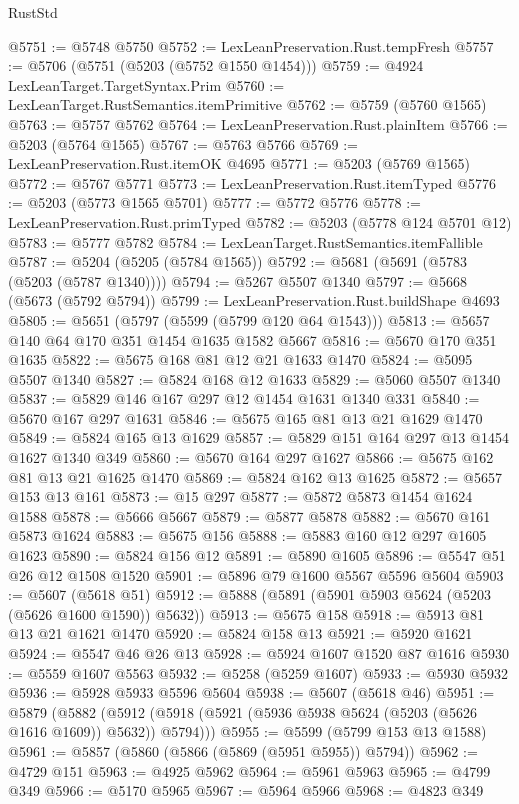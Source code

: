 \begin{lexlean}{RustStd}
\begin{coremodule}
{\begin{coremodule}
{{{{{{{{{{{{{{{{{{{{{{{{{{{{{{@5751 := @5748 @5750
@5752 := LexLeanPreservation.Rust.tempFresh
@5757 := @5706 (@5751 (@5203 (@5752 @1550 @1454)))
@5759 := @4924 LexLeanTarget.TargetSyntax.Prim
@5760 := LexLeanTarget.RustSemantics.itemPrimitive
@5762 := @5759 (@5760 @1565)
@5763 := @5757 @5762
@5764 := LexLeanPreservation.Rust.plainItem
@5766 := @5203 (@5764 @1565)
@5767 := @5763 @5766
@5769 := LexLeanPreservation.Rust.itemOK @4695
@5771 := @5203 (@5769 @1565)
@5772 := @5767 @5771
@5773 := LexLeanPreservation.Rust.itemTyped
@5776 := @5203 (@5773 @1565 @5701)
@5777 := @5772 @5776
@5778 := LexLeanPreservation.Rust.primTyped
@5782 := @5203 (@5778 @124 @5701 @12)
@5783 := @5777 @5782
@5784 := LexLeanTarget.RustSemantics.itemFallible
@5787 := @5204 (@5205 (@5784 @1565))
@5792 := @5681 (@5691 (@5783 (@5203 (@5787 @1340))))
@5794 := @5267 @5507 @1340
@5797 := @5668 (@5673 (@5792 @5794))
@5799 := LexLeanPreservation.Rust.buildShape @4693
@5805 := @5651 (@5797 (@5599 (@5799 @120 @64 @1543)))
@5813 := @5657 @140 @64 @170 @351 @1454 @1635 @1582 @5667
@5816 := @5670 @170 @351 @1635
@5822 := @5675 @168 @81 @12 @21 @1633 @1470
@5824 := @5095 @5507 @1340
@5827 := @5824 @168 @12 @1633
@5829 := @5060 @5507 @1340
@5837 := @5829 @146 @167 @297 @12 @1454 @1631 @1340 @331
@5840 := @5670 @167 @297 @1631
@5846 := @5675 @165 @81 @13 @21 @1629 @1470
@5849 := @5824 @165 @13 @1629
@5857 := @5829 @151 @164 @297 @13 @1454 @1627 @1340 @349
@5860 := @5670 @164 @297 @1627
@5866 := @5675 @162 @81 @13 @21 @1625 @1470
@5869 := @5824 @162 @13 @1625
@5872 := @5657 @153 @13 @161
@5873 := @15 @297
@5877 := @5872 @5873 @1454 @1624 @1588
@5878 := @5666 @5667
@5879 := @5877 @5878
@5882 := @5670 @161 @5873 @1624
@5883 := @5675 @156
@5888 := @5883 @160 @12 @297 @1605 @1623
@5890 := @5824 @156 @12
@5891 := @5890 @1605
@5896 := @5547 @51 @26 @12 @1508 @1520
@5901 := @5896 @79 @1600 @5567 @5596 @5604
@5903 := @5607 (@5618 @51)
@5912 := @5888 (@5891 (@5901 @5903 @5624 (@5203 (@5626 @1600 @1590)) @5632))
@5913 := @5675 @158
@5918 := @5913 @81 @13 @21 @1621 @1470
@5920 := @5824 @158 @13
@5921 := @5920 @1621
@5924 := @5547 @46 @26 @13
@5928 := @5924 @1607 @1520 @87 @1616
@5930 := @5559 @1607 @5563
@5932 := @5258 (@5259 @1607)
@5933 := @5930 @5932
@5936 := @5928 @5933 @5596 @5604
@5938 := @5607 (@5618 @46)
@5951 := @5879
    (@5882 (@5912 (@5918 (@5921 (@5936 @5938 @5624 (@5203 (@5626 @1616 @1609)) @5632)) @5794)))
@5955 := @5599 (@5799 @153 @13 @1588)
@5961 := @5857 (@5860 (@5866 (@5869 (@5951 @5955)) @5794))
@5962 := @4729 @151
@5963 := @4925 @5962
@5964 := @5961 @5963
@5965 := @4799 @349
@5966 := @5170 @5965
@5967 := @5964 @5966
@5968 := @4823 @349
}}}}}}}}}}}}}}}}}}}}}}}}}}}}}}
\end{coremodule}}
\end{coremodule}
\end{lexlean}
